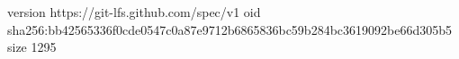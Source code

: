 version https://git-lfs.github.com/spec/v1
oid sha256:bb42565336f0cde0547c0a87e9712b6865836bc59b284bc3619092be66d305b5
size 1295
